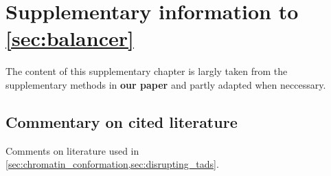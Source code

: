 \chapter{Supplementary information to \texorpdfstring{\cref{sec:balancer}}{the balancer project}}
\label{sec:suppl_balancer}


The content of this supplementary chapter is largly taken from the supplementary
methods in \textbf{our paper} and partly adapted when
neccessary.


\section{Commentary on cited literature}
\label{sec:suppl_balancer_literature}

Comments on literature used in \cref{sec:chromatin_conformation,sec:disrupting_tads}.
